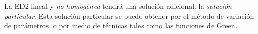 \par
La ED2 lineal y \textit{no homogénea} tendrá una solución adicional: la \emph{solución particular}. Esta solución particular se puede obtener por el método de variación de parámetros, o por medio de técnicas tales como las funciones de Green.
